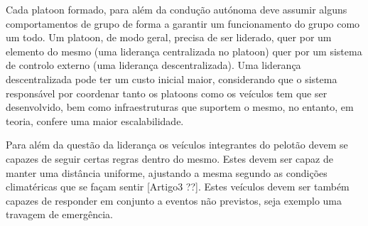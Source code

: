 \begin{table}[H]
\caption{Platooning vs Multi-lane Platooning}
\label{tab:my-table}
\end{table}



Cada platoon formado, para além da condução autónoma deve assumir alguns comportamentos de grupo de forma a garantir um funcionamento do grupo como um todo. Um platoon, de modo geral, precisa de ser liderado, quer por um elemento do mesmo (uma liderança centralizada no platoon) quer por um sistema de controlo externo (uma liderança descentralizada). Uma liderança descentralizada pode ter um custo inicial maior, considerando que o sistema responsável por coordenar tanto os platoons como os veículos tem que ser desenvolvido, bem como infraestruturas que suportem o mesmo, no entanto, em teoria, confere uma maior escalabilidade.

Para além da questão da liderança os veículos integrantes do pelotão devem se capazes de seguir certas regras dentro do mesmo. Estes devem ser capaz de manter uma distância uniforme, ajustando a mesma segundo as condições climatéricas que se façam sentir [Artigo3 ??]. Estes veículos devem ser também capazes de responder em conjunto a eventos não previstos, seja exemplo uma travagem de emergência.


